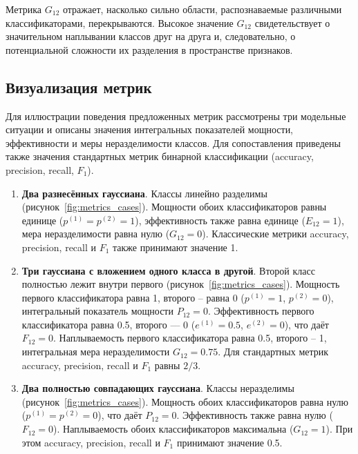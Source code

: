 Метрика \(G_{12}\) отражает, насколько сильно области, распознаваемые различными классификаторами, перекрываются. Высокое значение \(G_{12}\) свидетельствует о значительном наплывании классов друг на друга и, следовательно, о потенциальной сложности их разделения в пространстве признаков.


\subsection{Визуализация метрик}

Для иллюстрации поведения предложенных метрик рассмотрены три модельные ситуации и описаны значения интегральных показателей мощности, эффективности и меры неразделимости классов. Для сопоставления приведены также значения стандартных метрик бинарной классификации (accuracy, precision, recall, \(F_1\)).  

\begin{enumerate}
    \item \textbf{Два разнесённых гауссиана}. Классы линейно разделимы (рисунок~\cref{fig:metrics_cases}). Мощности обоих классификаторов равны единице (\(p^{(1)}=p^{(2)}= 1\)), эффективность также равна единице (\(E_{12} = 1\)), мера неразделимости равна нулю (\(G_{12} = 0\)). Классические метрики accuracy, precision, recall и \(F_1\) также принимают значение 1.  

    \item \textbf{Три гауссиана с вложением одного класса в другой}. Второй класс полностью лежит внутри первого (рисунок~\cref{fig:metrics_cases}). Мощность первого классификатора равна 1, второго -- равна 0 (\(p^{(1)} = 1\), \(p^{(2)}=0\)), интегральный показатель мощности \(P_{12} = 0\). Эффективность первого классификатора равна 0.5, второго — 0 (\(e^{(1)} = 0.5\), \(e^{(2)} = 0\)), что даёт \(F_{12}=0\). Наплываемость первого классификатора равна 0.5, второго -- 1, интегральная мера неразделимости \(G_{12} = 0.75\). Для стандартных метрик accuracy, precision, recall и \(F_1\) равны \(2/3\).  

    \item \textbf{Два полностью совпадающих гауссиана}. Классы неразделимы (рисунок~\cref{fig:metrics_cases}). Мощность обоих классификаторов равна нулю (\(p^{(1)} = p^{(2)} = 0\)), что даёт \(P_{12} = 0\). Эффективность также равна нулю (\(F_{12}=0\)). Наплываемость обоих классификаторов максимальна (\(G_{12} = 1\)). При этом accuracy, precision, recall и \(F_1\) принимают значение 0.5.
\end{enumerate}


